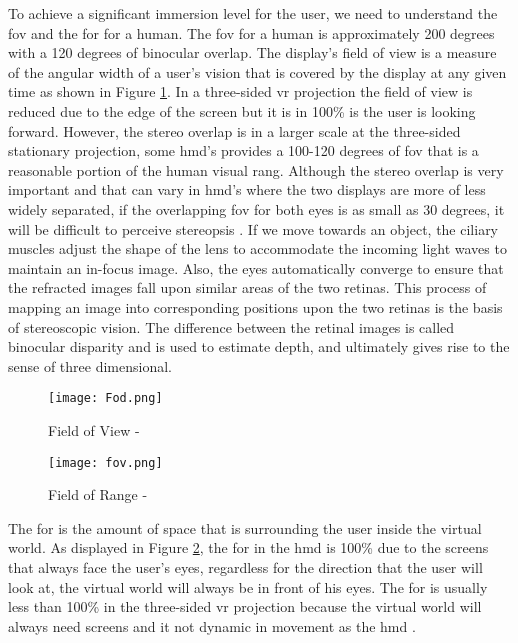 To achieve a significant immersion level for the user, we need to understand the \acrfull{fov} and the \acrfull{for} for a human. The \acrshort{fov} for a human is approximately 200 degrees with a 120 degrees of binocular overlap. The display's field of view is a measure of the angular width of a user's vision that is covered by the display at any given time as shown in Figure \ref{fig:field}. In a three-sided \acrshort{vr} projection the field of view is reduced due to the edge of the screen but it is in 100\% is the user is looking forward. However, the stereo overlap is in a larger scale at the three-sided stationary projection, some \acrlong{hmd}'s provides a 100-120 degrees of \acrshort{fov} that is a reasonable portion of the human visual rang. Although the stereo overlap is very important and that can vary in \acrshort{hmd}'s where the two displays are more of less widely separated, if the overlapping  
\acrshort{fov} for both eyes is as small as 30 degrees, it will be difficult to perceive stereopsis \citep{William}.
If we move towards an object, the ciliary muscles adjust the shape of the lens to accommodate
the incoming light waves to maintain an in-focus image. Also, the eyes automatically
converge to ensure that the refracted images fall upon similar areas of the
two retinas. This process of mapping an image into corresponding positions upon the
two retinas is the basis of stereoscopic vision. The difference between the retinal images
is called binocular disparity and is used to estimate depth, and ultimately gives rise to
the sense of three dimensional\citep{Vince2011}.

\begin{figure}[ht]
    \centering
    \texttt{[image: Fod.png]}
    \caption{Field of View - \citep{William}}
    \label{fig:field}
\end{figure}


\begin{figure}[ht]
    \centering
    \texttt{[image: fov.png]}
    \caption{Field of Range - \citep{William}}
    \label{fig:fod}
\end{figure}

The \acrfull{for} is the amount of space that is surrounding the user inside the virtual world. As displayed in Figure \ref{fig:fod}, the \acrshort{for} in the \acrshort{hmd} is 100\% due to the screens that always face the user's eyes, regardless for the direction that the user will look at, the virtual world will always be in front of his eyes. The \acrshort{for} is usually less than 100\% in the three-sided \acrshort{vr} projection because the virtual world will always need screens and it not dynamic in movement as the \acrlong{hmd} \citep{William}.

